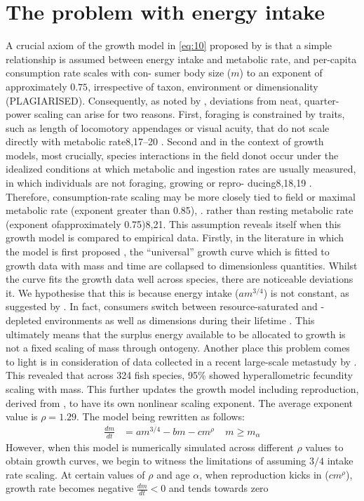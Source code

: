 \documentclass[a4paper]{article} %
\begin{document}
\section{The problem with energy intake}
A crucial axiom of the growth model in \ref{eq:10} proposed by \cite{West2001} is that a simple relationship is assumed between energy intake and metabolic rate, and per-capita consumption rate scales with con- sumer body size ($m$) to an exponent of approximately $0.75$, irrespective of taxon, environment or dimensionality (PLAGIARISED). Consequently, as noted by \cite{Pawar2012}, deviations from neat, quarter-power scaling can arise for two reasons. First, foraging is constrained by traits, such as length of locomotory appendages or visual acuity, that do not scale directly with metabolic rate8,17–20
. Second and in the context of growth models, most crucially, species interactions in the field donot occur under the
idealized conditions at which metabolic and ingestion rates are usually measured, in which individuals are not foraging, growing or repro- ducing8,18,19
. Therefore, consumption-rate scaling may be more closely
tied to field or maximal metabolic rate (exponent greater than 0.85),
.
rather than resting metabolic rate (exponent ofapproximately 0.75)8,21. This assumption reveals itself when this growth model is compared to empirical data. Firstly, in the literature in which the model is first proposed \autocite{West2001}, the ``universal'' growth curve which is fitted to growth data with mass and time are collapsed to dimensionless quantities. Whilst the curve fits the growth data well across species, there are noticeable deviations it. We hypothesise that this is because energy intake ($am^{3/4}$) is not constant, as suggested by \cite{West2001}. In fact, consumers switch between resource-saturated and -depleted environments as well as dimensions during their lifetime \autocite{Pawar2012}. This ultimately means that the surplus energy available to be allocated to growth is not a fixed scaling of mass through ontogeny. Another place this problem comes to light is in consideration of data collected in a recent large-scale metastudy by \cite{Barneche2018d}. This revealed that across 324 fish species, 95\% showed hyperallometric fecundity scaling with mass. This further updates the \cite{Charnov2001} growth model including reproduction, derived from \cite{West2001}, to have its own nonlinear scaling exponent. The average exponent value is $\rho = 1.29$. The model being rewritten as follows:
\begin{align}
    \frac{dm}{dt} &= am^{3/4} - bm - cm^{\rho} \ \ \ \ \ m \geq m_{\alpha}
\end{align}
However, when this model is numerically simulated across different $\rho$ values to obtain growth curves, we begin to witness the limitations of assuming $3/4$ intake rate scaling. At certain values of $\rho$ and age $\alpha$, when reproduction kicks in ($cm^{\rho}$), growth rate becomes negative $\frac{dm}{dt} < 0$ and tends towards zero 
\end{document}
